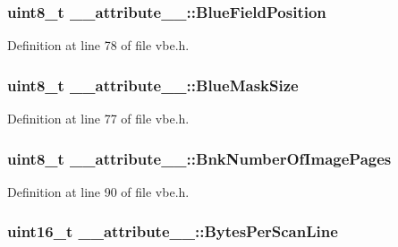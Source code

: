 \subsubsection[{Blue\+Field\+Position}]{\setlength{\rightskip}{0pt plus 5cm}uint8\+\_\+t \+\_\+\+\_\+attribute\+\_\+\+\_\+\+::\+Blue\+Field\+Position}\label{struct____attribute_____ada852d5ed926757d24b5038a38e6292c}


Definition at line 78 of file vbe.\+h.

\hypertarget{struct____attribute_____ab5967602a79dcb7f0061195ffdaaa47a}{}
\subsubsection[{Blue\+Mask\+Size}]{\setlength{\rightskip}{0pt plus 5cm}uint8\+\_\+t \+\_\+\+\_\+attribute\+\_\+\+\_\+\+::\+Blue\+Mask\+Size}\label{struct____attribute_____ab5967602a79dcb7f0061195ffdaaa47a}


Definition at line 77 of file vbe.\+h.

\hypertarget{struct____attribute_____ad5820084f2b821b85a635df8394f0d9e}{}
\subsubsection[{Bnk\+Number\+Of\+Image\+Pages}]{\setlength{\rightskip}{0pt plus 5cm}uint8\+\_\+t \+\_\+\+\_\+attribute\+\_\+\+\_\+\+::\+Bnk\+Number\+Of\+Image\+Pages}\label{struct____attribute_____ad5820084f2b821b85a635df8394f0d9e}


Definition at line 90 of file vbe.\+h.

\hypertarget{struct____attribute_____a3c9eb4b107ecee102c6e63f9054ede06}{}
\subsubsection[{Bytes\+Per\+Scan\+Line}]{\setlength{\rightskip}{0pt plus 5cm}uint16\+\_\+t \+\_\+\+\_\+attribute\+\_\+\+\_\+\+::\+Bytes\+Per\+Scan\+Line}\label{struct____attribute_____a3c9eb4b107ecee102c6e63f9054ede06}


